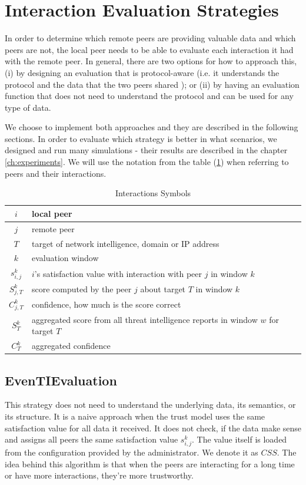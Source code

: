 \section{Interaction Evaluation Strategies}
\label{sec:interaction-evaluation-strategies}
In order to determine which remote peers are providing valuable data and which peers are not, the local peer needs to be able to evaluate each interaction it had with the remote peer.
In general, there are two options for how to approach this, (i) by designing an evaluation that is protocol-aware (i.e. it understands the protocol and the data that the two peers shared ); or (ii) by having an evaluation function that does not need to understand the protocol and can be used for any type of data.

We choose to implement both approaches and they are described in the following sections. In order to evaluate which strategy is better in what scenarios, we designed and run many simulations - their results are described in the chapter \ref{ch:experiments}. 
We will use the notation from the table (\ref{table:interaction-eval})  when referring to peers and their interactions.

\begin{table}[h!]
\centering
\begin{tabular}{ c | m{20em} }
 $i$ & local peer \\
 \hline
 $j$ & remote peer \\
 \hline
 $T$ & target of network intelligence, domain or IP address \\
 \hline
 $k$ & evaluation window \\
 \hline
 $s^{k}_{i, j}$ & $i$'s satisfaction value with interaction with peer $j$ in window $k$\\
 \hline
 $S^{k}_{j, T}$ & score computed by the peer $j$ about target $T$ in window $k$ \\
 \hline
 $C^{k}_{j, T}$ & confidence, how much is the score correct \\
 \hline
 $S^{k}_{T}$ & aggregated score from all threat intelligence reports in window $w$ for target $T$ \\
 \hline
 $C^{k}_{T}$ & aggregated confidence
\end{tabular}
\caption{Interactions Symbols}
\label{table:interaction-eval}
\end{table}

\subsection{EvenTIEvaluation}
\label{subsec:same-eval-for-all-interactions}
This strategy does not need to understand the underlying data, its semantics, or its structure.
It is a naive approach when the trust model uses the same satisfaction value for all data it received. It does not check, if the data make sense and assigns all peers the same satisfaction value $s^{k}_{i, j}$.
The value itself is loaded from the configuration provided by the administrator. We denote it as $CSS$. 
The idea behind this algorithm is that when the peers are interacting for a long time or have more interactions, they're more trustworthy.

